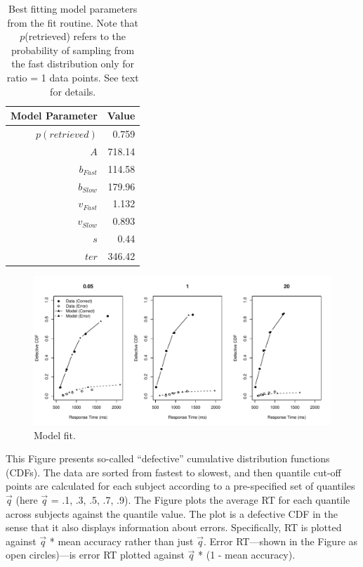 \documentclass[a4paper, jou, natbib]{apa6}
\begin{document}
\begin{table}[htbp]
  \centering
  \caption{Best fitting model parameters from the fit routine. Note that $p$(retrieved) refers to the probability of sampling from the fast distribution only for ratio = 1 data points. See text for details.}
    \begin{tabular}{rr}
    \toprule
    Model Parameter & Value \\
    \midrule
    $p(retrieved)$     & 0.759 \\
    $A$     & 718.14 \\
    $b_{Fast}$ & 114.58 \\
    $b_{Slow}$ & 179.96 \\
    $v_{Fast}$ & 1.132 \\
    $v_{Slow}$ & 0.893 \\
    $s$     & 0.44 \\
    $ter$   & 346.42 \\
    \bottomrule
    \end{tabular}%
  \label{tab:bestParameters}%
\end{table}%




\begin{figure}
\begin{center}
\includegraphics[width = \textwidth]{Images/qmp2RCI_drift_+_b.pdf}
\caption{Model fit.}
\label{fig:modelFit}
\end{center}
\end{figure}

This Figure presents so-called ``defective'' cumulative distribution functions (CDFs). The data are sorted from fastest to slowest, and then quantile cut-off points are calculated for each subject according to a pre-specified set of quantiles $\vec{q}$ (here $\vec{q}$ = .1, .3, .5, .7, .9). The Figure plots the average RT for each quantile across subjects against the quantile value. The plot is a defective CDF in the sense that it also displays information about errors. Specifically, RT is plotted against $\vec{q}$ * mean accuracy rather than just $\vec{q}$. Error RT---shown in the Figure as open circles)---is error RT plotted against $\vec{q}$ * (1 - mean accuracy).
\end{document}
